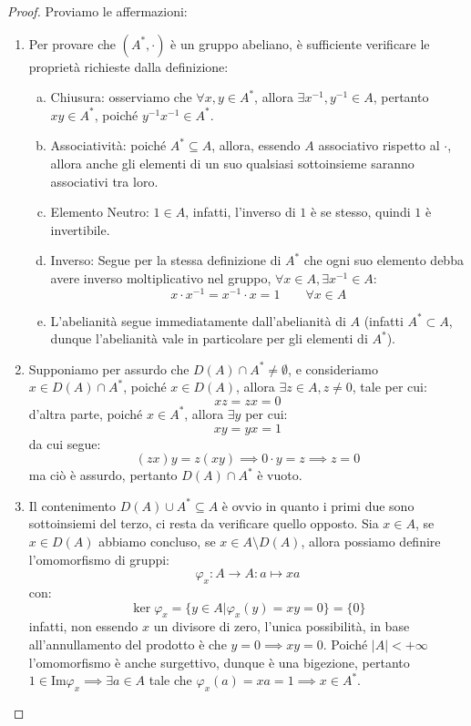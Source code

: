 \documentclass[11pt]{scrartcl}
\begin{document}
\begin{proof}
    Proviamo le affermazioni:
    \begin{enumerate}[(1)]
        \item Per provare che $(A^*, \cdot)$ è un gruppo abeliano, è sufficiente verificare le proprietà richieste dalla definizione:
        \begin{enumerate}[(a)]
            \item Chiusura: osserviamo che $\forall x,y \in A^*$, allora $\exists x^{-1},y^{-1} \in A$, pertanto $xy \in A^*$, poiché $y^{-1}x^{-1} \in A^*$. 
            \item Associatività: poiché $A^* \subseteq A$, allora, essendo $A$ associativo rispetto al $\cdot$, allora anche gli elementi di un suo qualsiasi sottoinsieme saranno associativi tra loro. 
            \item Elemento Neutro: $1 \in A$, infatti, l'inverso di $1$ è se stesso, quindi $1$ è invertibile.
            \item Inverso: Segue per la stessa definizione di $A^*$ che ogni suo elemento debba avere inverso moltiplicativo nel gruppo, $\forall x \in A, \exists x^{-1} \in A$:
                \[ x \cdot x^{-1} = x^{-1} \cdot x = 1
                \qquad
                \forall x \in A
                \]
            \item L'abelianità segue immediatamente dall'abelianità di $A$ (infatti $A^* \subset A$, dunque l'abelianità vale in particolare per gli elementi di $A^*$).
        \end{enumerate}
        \item Supponiamo per assurdo che $D(A) \cap A^* \neq \emptyset$, e consideriamo $x \in D(A) \cap A^*$, poiché $x \in D(A)$, allora $\exists z \in A, z \ne 0$, tale per cui:
		    \[ xz = zx = 0
		        \]
            d'altra parte, poiché $x \in A^*$, allora $\exists y$ per cui:
            \[  xy = yx = 1
                    \]
            da cui segue:
            \[ (zx)y = z(xy) \implies 0 \cdot y = z \implies z = 0
                    \]
            ma ciò è assurdo, pertanto $D(A) \cap A^*$ è vuoto.
        \item Il contenimento $D(A) \cup A^* \subseteq A$ è ovvio in quanto i primi due sono sottoinsiemi del terzo, ci resta da verificare quello opposto. Sia $x \in A$, se $x \in D(A)$ abbiamo concluso,
            se $x \in A \setminus D(A)$, allora possiamo definire l'omomorfismo di gruppi:
                \[ \varphi_x : A \longrightarrow A : a \longmapsto xa
                    \]
            con:
                \[ \ker \varphi_{x} = \{y \in A | \varphi_x(y) = xy = 0\} = \{0\}
                    \]
            infatti, non essendo $x$ un divisore di zero, l'unica possibilità, in base all'annullamento del prodotto è che $y = 0 \implies xy = 0$. Poiché $|A| < +\infty$ l'omomorfismo è anche surgettivo, dunque è una bigezione,
            pertanto $1 \in \text{Im} \varphi_x \implies \exists a \in A$ tale che $\varphi_x(a) = xa = 1 \implies x \in A^*$.
    \end{enumerate}
\end{proof}
\end{document}
